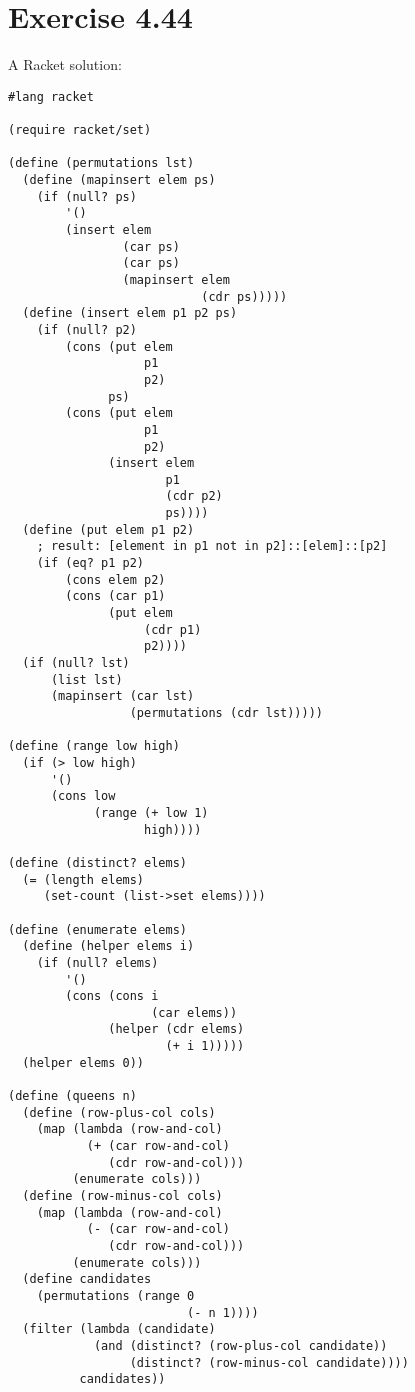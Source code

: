 \documentclass[../main.tex]{subfiles}
\begin{document}
\section{Exercise 4.44}

A Racket solution:

\begin{lstlisting}
#lang racket

(require racket/set)

(define (permutations lst)
  (define (mapinsert elem ps)
    (if (null? ps)
        '()
        (insert elem
                (car ps)
                (car ps)
                (mapinsert elem
                           (cdr ps)))))
  (define (insert elem p1 p2 ps)
    (if (null? p2)
        (cons (put elem
                   p1
                   p2)
              ps)
        (cons (put elem
                   p1
                   p2)
              (insert elem
                      p1
                      (cdr p2)
                      ps))))
  (define (put elem p1 p2)
    ; result: [element in p1 not in p2]::[elem]::[p2]
    (if (eq? p1 p2)
        (cons elem p2)
        (cons (car p1)
              (put elem
                   (cdr p1)
                   p2))))
  (if (null? lst)
      (list lst)
      (mapinsert (car lst)
                 (permutations (cdr lst)))))

(define (range low high)
  (if (> low high)
      '()
      (cons low
            (range (+ low 1)
                   high))))

(define (distinct? elems)
  (= (length elems)
     (set-count (list->set elems))))

(define (enumerate elems)
  (define (helper elems i)
    (if (null? elems)
        '()
        (cons (cons i
                    (car elems))
              (helper (cdr elems)
                      (+ i 1)))))
  (helper elems 0))

(define (queens n)
  (define (row-plus-col cols)
    (map (lambda (row-and-col)
           (+ (car row-and-col)
              (cdr row-and-col)))
         (enumerate cols)))
  (define (row-minus-col cols)
    (map (lambda (row-and-col)
           (- (car row-and-col)
              (cdr row-and-col)))
         (enumerate cols)))
  (define candidates
    (permutations (range 0
                         (- n 1))))
  (filter (lambda (candidate)
            (and (distinct? (row-plus-col candidate))
                 (distinct? (row-minus-col candidate))))
          candidates))
\end{lstlisting}
\end{document}
